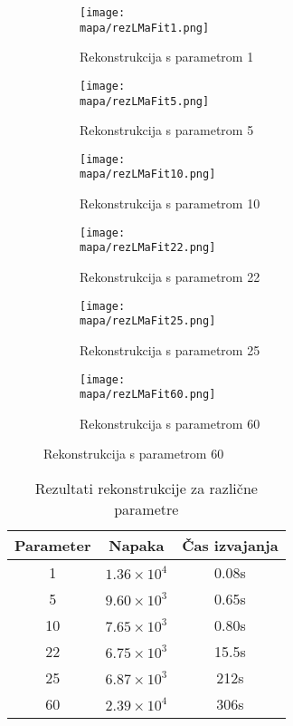 \renewcommand{\mapa}{Poglavja/Slike/informacija ranga}

\begin{figure}[!ht]
    \begin{subfigure}{0.325\linewidth}
        \texttt{[image: \\mapa/rezLMaFit1.png]}
        \caption{Rekonstrukcija s parametrom 1}
    \end{subfigure}
    \hfill
    \begin{subfigure}{0.325\linewidth}
        \texttt{[image: \\mapa/rezLMaFit5.png]}
        \caption{Rekonstrukcija s parametrom 5}
    \end{subfigure}
    \hfill
    \begin{subfigure}{0.325\linewidth}
        \texttt{[image: \\mapa/rezLMaFit10.png]}
        \caption{Rekonstrukcija s parametrom 10}
    \end{subfigure}

    \begin{subfigure}{0.325\linewidth}
        \texttt{[image: \\mapa/rezLMaFit22.png]}
        \caption{Rekonstrukcija s parametrom 22}
    \end{subfigure}
    \hfill
    \begin{subfigure}{0.325\linewidth}
        \texttt{[image: \\mapa/rezLMaFit25.png]}
        \caption{Rekonstrukcija s parametrom 25}
    \end{subfigure}
    \hfill
    \begin{subfigure}{0.325\linewidth}
        \texttt{[image: \\mapa/rezLMaFit60.png]}
        \caption{Rekonstrukcija s parametrom 60}
    \end{subfigure}
\end{figure}

\begin{table}[h]
    \centering
    \begin{tabular}{|c|c|c|}
        \hline
        Parameter & Napaka & Čas izvajanja \\
        \hline
        1         & $1.36 \times 10^4$ & 0.08s        \\
        5         & $9.60 \times 10^3$ & 0.65s         \\
        10        & $7.65 \times 10^3$ & 0.80s        \\
        22        & $6.75 \times 10^3$ & 15.5s       \\
        25        & $6.87 \times 10^3$ & 212s        \\
        60        & $2.39 \times 10^4$ & 306s        \\
        \hline
    \end{tabular}
    \caption{Rezultati rekonstrukcije za različne parametre}
\end{table}

